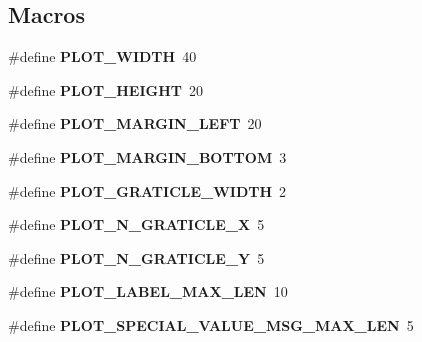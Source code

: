 \subsection*{Macros}
\begin{DoxyCompactItemize}
\item 
\#define {\bfseries P\+L\+O\+T\+\_\+\+W\+I\+D\+TH}~40\hypertarget{bicorder-plotter_8h_a1fc4b17a5ce75463f2c6737654058dc9}{}\label{bicorder-plotter_8h_a1fc4b17a5ce75463f2c6737654058dc9}

\item 
\#define {\bfseries P\+L\+O\+T\+\_\+\+H\+E\+I\+G\+HT}~20\hypertarget{bicorder-plotter_8h_a2b49d5c686e9bd4f2ec6a3005eb798a5}{}\label{bicorder-plotter_8h_a2b49d5c686e9bd4f2ec6a3005eb798a5}

\item 
\#define {\bfseries P\+L\+O\+T\+\_\+\+M\+A\+R\+G\+I\+N\+\_\+\+L\+E\+FT}~20\hypertarget{bicorder-plotter_8h_a801b6f0ba4569299c3c6daf4e0defda5}{}\label{bicorder-plotter_8h_a801b6f0ba4569299c3c6daf4e0defda5}

\item 
\#define {\bfseries P\+L\+O\+T\+\_\+\+M\+A\+R\+G\+I\+N\+\_\+\+B\+O\+T\+T\+OM}~3\hypertarget{bicorder-plotter_8h_a2df60d2bc9bba913eb61dcf29214f6d3}{}\label{bicorder-plotter_8h_a2df60d2bc9bba913eb61dcf29214f6d3}

\item 
\#define {\bfseries P\+L\+O\+T\+\_\+\+G\+R\+A\+T\+I\+C\+L\+E\+\_\+\+W\+I\+D\+TH}~2\hypertarget{bicorder-plotter_8h_a58bdff8bea8d71f3d5b138d2b926ed76}{}\label{bicorder-plotter_8h_a58bdff8bea8d71f3d5b138d2b926ed76}

\item 
\#define {\bfseries P\+L\+O\+T\+\_\+\+N\+\_\+\+G\+R\+A\+T\+I\+C\+L\+E\+\_\+X}~5\hypertarget{bicorder-plotter_8h_afe7c4f9a4b7def188820c34befedd6c2}{}\label{bicorder-plotter_8h_afe7c4f9a4b7def188820c34befedd6c2}

\item 
\#define {\bfseries P\+L\+O\+T\+\_\+\+N\+\_\+\+G\+R\+A\+T\+I\+C\+L\+E\+\_\+Y}~5\hypertarget{bicorder-plotter_8h_ae49e5006579bd892974523899b206c1e}{}\label{bicorder-plotter_8h_ae49e5006579bd892974523899b206c1e}

\item 
\#define {\bfseries P\+L\+O\+T\+\_\+\+L\+A\+B\+E\+L\+\_\+\+M\+A\+X\+\_\+\+L\+EN}~10\hypertarget{bicorder-plotter_8h_aad7c802940ad17ae1b915ccef7f85d29}{}\label{bicorder-plotter_8h_aad7c802940ad17ae1b915ccef7f85d29}

\item 
\#define {\bfseries P\+L\+O\+T\+\_\+\+S\+P\+E\+C\+I\+A\+L\+\_\+\+V\+A\+L\+U\+E\+\_\+\+M\+S\+G\+\_\+\+M\+A\+X\+\_\+\+L\+EN}~5\hypertarget{bicorder-plotter_8h_a6b18117f2d9616dadc7b0d8cc04c4a0f}{}\label{bicorder-plotter_8h_a6b18117f2d9616dadc7b0d8cc04c4a0f}

\end{DoxyCompactItemize}
